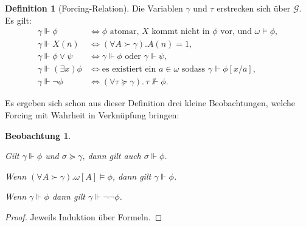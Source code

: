 \documentclass[nofonts]{uebung}
\newtheorem{observation}[theorem]{Beobachtung}
\theoremstyle{definition}
\newtheorem{definition}[theorem]{Definition}
\begin{document}
\begin{definition}[Forcing-Relation]
Die Variablen $\gamma$ und $\tau$ erstrecken sich über $\mathcal G$. Es gilt:
\begin{align*}
    \gamma\Vdash\phi &\iff \text{$\phi$ atomar, $X$ kommt nicht in $\phi$ vor, und $\omega\vDash\phi$},\\
    \gamma\Vdash X(\overline n)&\iff(\forall A\succ\gamma).A(n)=1,\\
    \gamma\Vdash \phi\lor\psi &\iff\gamma\Vdash\phi\text{ oder } \gamma\Vdash \psi,\\
    \gamma\Vdash(\exists x)\phi &\iff \text{es existiert ein $a\in\omega$ sodass } \gamma\Vdash \phi[x/\overline{a}],\\
    \gamma\Vdash \neg\phi &\iff (\forall \tau\succeq \gamma).\,\tau\not\Vdash\phi.
\end{align*}
\end{definition}

Es ergeben sich schon aus dieser Definition drei kleine Beobachtungen, welche Forcing mit Wahrheit in Verknüpfung bringen:
\begin{observation}
    \begin{thmenum}
    \item \label{obs:forcing-extension} Gilt $\gamma\Vdash\phi$ und $\sigma\succeq \gamma$, dann gilt auch $\sigma\Vdash \phi$.
    \item \label{obs:forcing-by-universaity} Wenn $(\forall A\succ \gamma).\omega[A]\vDash\phi$, dann gilt $\gamma\Vdash\phi$.
    \item Wenn $\gamma\Vdash\phi$ dann gilt $\gamma\Vdash\neg\neg\phi$.
    \end{thmenum}
\end{observation}
\begin{proof}
    Jeweils Induktion über Formeln. 
\end{proof}
\end{document}
